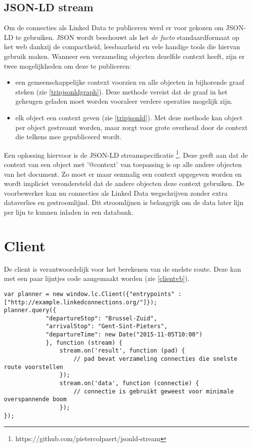 \subsection {JSON-LD stream}
\label{jsonldstream}
Om de connecties als Linked Data te publiceren werd er voor gekozen om JSON-LD te gebruiken. JSON wordt beschouwt als het \textit{de facto} standaardformaat op het web dankzij de compactheid, leesbaarheid en vele handige tools die hiervan gebruik maken. Wanneer een verzameling objecten dezelfde context heeft, zijn er twee mogelijkheden om deze te publiceren:
\begin{itemize}
\item een gemeenschappelijke context voorzien en alle objecten in bijhorende graaf steken (zie \ref{tripjsonldgraph}). Deze methode vereist dat de graaf in het geheugen geladen moet worden vooraleer verdere operaties mogelijk zijn.
\item elk object een context geven (zie \ref{tripjsonld}). Met deze methode kan object per object gestreamt worden, maar zorgt voor grote overhead door de context die telkens mee gepubliceerd wordt.
\end{itemize}
Een oplossing hiervoor is de JSON-LD streamspecificatie \footnote{https://github.com/pietercolpaert/jsonld-stream}. Deze geeft aan dat de context van een object met '@context' van toepassing is op alle andere objecten van het document. Zo moet er maar eenmalig een context opgegeven worden en wordt impliciet verondersteld dat de andere objecten deze context gebruiken.
De voorbewerker kan nu connecties als Linked Data wegschrijven zonder extra dataverlies en gestroomlijnd. Dit stroomlijnen is belangrijk om de data later lijn per lijn te kunnen inladen in een databank.

\section{Client}

De client is verantwoordelijk voor het berekenen van de snelste route. Deze kan met een paar lijntjes code aangemaakt worden (zie \ref{clientvb}).
\begin{lstlisting}[label=clientvb,caption=Code om client op te zetten in JavaScript.]
var planner = new window.lc.Client({"entrypoints" : ["http://example.linkedconnections.org/"]});
planner.query({
			"departureStop": "Brussel-Zuid",
			"arrivalStop": "Gent-Sint-Pieters",
			"departureTime": new Date("2015-11-05T10:00")
			}, function (stream) {
				stream.on('result', function (pad) {
					// pad bevat verzameling connecties die snelste route voorstellen
				});
			 	stream.on('data', function (connectie) {
			 		// connectie is gebruikt geweest voor minimale overspannende boom
			 	});
});
\end{lstlisting}
\label{vbclient}

